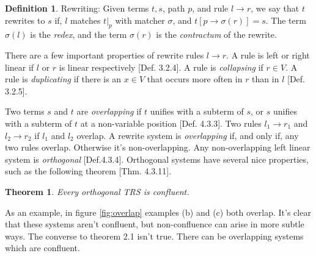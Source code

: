 \documentclass{book}
\newtheorem{theorem}{Theorem}
\theoremstyle{definition}
\newtheorem{definition}{Definition}[section]
\begin{document}
\theoremstyle{definition}
\begin{definition}{Rewriting:}
Given terms $t,s$, path $p$, and rule $l \to r$, we say that $t$ rewrites to $s$ if, 
$l$ matches $t\vert_p$ with matcher $\sigma$, and $t[p \to \sigma(r)] = s$.
The term $\sigma(l)$ is the \emph{redex}, and the term $\sigma(r)$ is the \emph{contractum}
of the rewrite.
\end{definition}

There are a few important properties of rewrite rules $l \to r$.
A rule is left or right linear if $l$ or $r$ is linear respectively
\cite{AdvancedTRS}[Def. 3.2.4].
A rule is \emph{collapsing} if $r \in V$.
A rule is \emph{duplicating} if there is an $x \in V$ that occurs more often in $r$ than in $l$
\cite{AdvancedTRS}[Def. 3.2.5].

Two terms $s$ and $t$ are \emph{overlapping} if $t$ unifies with a subterm of $s$,
or $s$ unifies with a subterm of $t$ at a non-variable position \cite{AdvancedTRS}[Def. 4.3.3].
Two rules $l_1 \to r_1$ and $l_2 \to r_2$ if $l_1$ and $l_2$ overlap.
A rewrite system is \emph{overlapping} if, and only if, any two rules overlap.
Otherwise it's non-overlapping.
Any non-overlapping left linear system is \emph{orthogonal} \cite{AdvancedTRS}[Def.4.3.4].
Orthogonal systems have several nice properties, such as the following theorem \cite{AdvancedTRS}[Thm. 4.3.11].

\begin{theorem}
Every orthogonal TRS is confluent.
\end{theorem}

As an example, in figure \ref{fig:overlap} examples (b) and (c) both overlap.
It's clear that these systems aren't confluent,
but non-confluence can arise in more subtle ways.
The converse to theorem 2.1 isn't true. There can be overlapping systems which are confluent.
\end{document}
